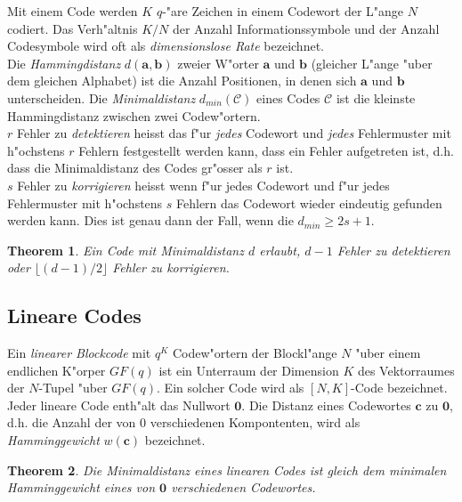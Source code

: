 \documentclass[german, 10pt, a4paper, twocolumn]{scrartcl}
\newtheorem{theorem}{Theorem}
\begin{document}
Mit einem Code werden $K$ $q$-"are Zeichen in einem Codewort der L"ange $N$ codiert. Das Verh"altnis $K/N$ der Anzahl Informationssymbole und der Anzahl Codesymbole wird oft als \textit{dimensionslose Rate} bezeichnet.\\

Die \textit{Hammingdistanz} $d(\mathbf{a},\mathbf{b})$ zweier W"orter $\mathbf{a}$ und $\mathbf{b}$ (gleicher L"ange "uber dem gleichen Alphabet) ist die Anzahl Positionen, in denen sich $\mathbf{a}$ und $\mathbf{b}$ unterscheiden. Die \textit{Minimaldistanz} $d_{min}(\mathcal{C})$ eines Codes $\mathcal{C}$ ist die kleinste Hammingdistanz zwischen zwei Codew"ortern.\\

$r$ Fehler zu \textit{detektieren} heisst das f"ur \textit{jedes} Codewort und \textit{jedes} Fehlermuster mit h"ochstens $r$ Fehlern festgestellt werden kann, dass ein Fehler aufgetreten ist, d.h. dass die Minimaldistanz des Codes gr"osser als $r$ ist.\\
$s$ Fehler zu \textit{korrigieren} heisst wenn f"ur jedes Codewort und f"ur jedes Fehlermuster mit h"ochstens $s$ Fehlern das Codewort wieder eindeutig gefunden werden kann. Dies ist genau dann der Fall, wenn die $d_{min} \geq 2s +1$.

\begin{theorem}
	Ein Code mit Minimaldistanz $d$ erlaubt, $d-1$ Fehler zu detektieren oder $\lfloor (d-1) / 2\rfloor$ Fehler zu korrigieren.
\end{theorem}

\subsection{Lineare Codes}

Ein \textit{linearer Blockcode} mit $q^K$ Codew"ortern der Blockl"ange $N$ "uber einem endlichen K"orper $GF(q)$ ist ein Unterraum der Dimension $K$ des Vektorraumes der $N$-Tupel "uber $GF(q)$. Ein solcher Code wird als $[N,K]$-Code bezeichnet.\\

Jeder lineare Code enth"alt das Nullwort $\mathbf{0}$. Die Distanz eines Codewortes $\mathbf{c}$ zu $\mathbf{0}$, d.h. die Anzahl der von 0 verschiedenen Kompontenten, wird als \textit{Hamminggewicht} $w(\mathbf{c})$ bezeichnet.

\begin{theorem}
	Die Minimaldistanz eines linearen Codes ist gleich dem minimalen Hamminggewicht eines von $\mathbf{0}$ verschiedenen Codewortes.
\end{theorem}
\end{document}
